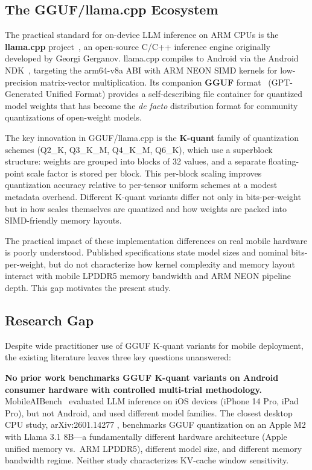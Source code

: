\documentclass[conference]{IEEEtran}
\begin{document}
\subsection{The GGUF/llama.cpp Ecosystem}

The practical standard for on-device LLM inference on ARM CPUs is the
\textbf{llama.cpp} project~\cite{llamacpp}, an open-source C/C++ inference
engine originally developed by Georgi Gerganov. llama.cpp compiles to Android
via the Android NDK~\cite{androidndk}, targeting the arm64-v8a ABI with ARM
NEON SIMD kernels for low-precision matrix-vector multiplication. Its companion
\textbf{GGUF} format~\cite{gguf} (GPT-Generated Unified Format) provides a
self-describing file container for quantized model weights that has become the
\emph{de facto} distribution format for community quantizations of open-weight
models.

The key innovation in GGUF/llama.cpp is the \textbf{K-quant} family of
quantization schemes (Q2\_K, Q3\_K\_M, Q4\_K\_M, Q6\_K), which use a
superblock structure: weights are grouped into blocks of 32 values, and a
separate floating-point scale factor is stored per block. This per-block
scaling improves quantization accuracy relative to per-tensor uniform schemes
at a modest metadata overhead. Different K-quant variants differ not only in
bits-per-weight but in how scales themselves are quantized and how weights are
packed into SIMD-friendly memory layouts.

The practical impact of these implementation differences on real mobile hardware
is poorly understood. Published specifications state model sizes and nominal
bits-per-weight, but do not characterize how kernel complexity and memory layout
interact with mobile LPDDR5 memory bandwidth and ARM NEON pipeline depth.
This gap motivates the present study.

\subsection{Research Gap}

Despite wide practitioner use of GGUF K-quant variants for mobile deployment,
the existing literature leaves three key questions unanswered:

\textbf{No prior work benchmarks GGUF K-quant variants on Android consumer
hardware with controlled multi-trial methodology.} MobileAIBench~\cite{mobileaibench}
evaluated LLM inference on iOS devices (iPhone 14 Pro, iPad Pro), but not Android,
and used different model families. The closest desktop CPU study, arXiv:2601.14277
\cite{whichquant}, benchmarks GGUF quantization on an Apple M2 with Llama 3.1 8B---a
fundamentally different hardware architecture (Apple unified memory vs.\ ARM
LPDDR5), different model size, and different memory bandwidth regime.
Neither study characterizes KV-cache window sensitivity.
\end{document}
